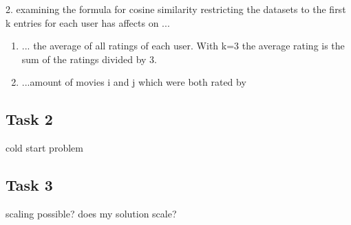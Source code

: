 \documentclass[a4paper,10pt,twoside]{article}
\begin{document}
2. examining the formula for cosine similarity
restricting the datasets to the first k entries for each user has affects on ...

\begin{enumerate}
	\item ... the average of all ratings of each user. With k=3 the average rating is the sum of the ratings divided by 3.
	\item ...amount of movies i and j which were both rated by 
\end{enumerate}



\subsection{Task 2}
cold start problem

\subsection{Task 3}
scaling possible? does my solution scale?
\end{document}
